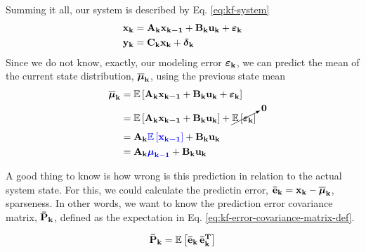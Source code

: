 \documentclass[12pt]{article}
\begin{document}
Summing it all, our system is described by Eq. \ref{eq:kf-system}
\begin{equation}
    \begin{aligned}
        \boldsymbol{\mathbf{x_k}} &= \boldsymbol{\mathbf{A_k}}\boldsymbol{\mathbf{x_{k-1}}} + \boldsymbol{\mathbf{B_k}}\boldsymbol{\mathbf{u_k}} + {\boldsymbol{\varepsilon}}_\mathbf{k}\\
        \boldsymbol{\mathbf{y_k}} &= \boldsymbol{\mathbf{C_k}}\boldsymbol{\mathbf{x_k}} + {\boldsymbol{\delta}}_\mathbf{k}
    \end{aligned}
    \label{eq:kf-system}
\end{equation}
Since we do not know, exactly, our modeling error ${\boldsymbol{\varepsilon}}_\mathbf{k}$, we can predict the mean of the current state distribution, ${\boldsymbol{\overline{\mu}}}_\mathbf{k}$, using the previous state mean
\begin{equation}
    \begin{aligned}
        {\boldsymbol{\overline{\mu}}}_\mathbf{k} &= \mathbb{E}\left[\boldsymbol{\mathbf{A_k}}\boldsymbol{\mathbf{x_{k-1}}} + \boldsymbol{\mathbf{B_k}}\boldsymbol{\mathbf{u_k}} + {\boldsymbol{\varepsilon}}_\mathbf{k}\right]\\
        & = \mathbb{E}\left[\boldsymbol{\mathbf{A_k}}\boldsymbol{\mathbf{x_{k-1}}} + \boldsymbol{\mathbf{B_k}}\boldsymbol{\mathbf{u_k}}\right] + \cancelto{\boldsymbol{\mathbf{0}}}{\mathbb{E}\left[{\boldsymbol{\varepsilon}}_\mathbf{k}\right]}\\
        &= \boldsymbol{\mathbf{A_k}}\color{blue}\mathbb{E}\left[\boldsymbol{\mathbf{x_{k-1}}}\right]\color{black} + \boldsymbol{\mathbf{B_k}}\boldsymbol{\mathbf{u_k}}\\
        &= \boldsymbol{\mathbf{A_k}}\color{blue}{\boldsymbol{\mu}}_\mathbf{k-1}\color{black} + \boldsymbol{\mathbf{B_k}}\boldsymbol{\mathbf{u_k}}
    \end{aligned}
    \label{eq:kf-prdiction}
\end{equation}

A good thing to know is how wrong is this prediction in relation to the actual system state. For this, we could calculate the predictin error, $\boldsymbol{\mathbf{\bar{e}_k}} = \boldsymbol{\mathbf{x_k}} - {\boldsymbol{\overline{\mu}}}_\mathbf{k}$, sparseness. In other words, we want to know the prediction error covariance matrix, $\boldsymbol{\mathbf{\bar{P}_k}}$, defined as the expectation in Eq. \ref{eq:kf-error-covariance-matrix-def}.

\begin{equation}
    \boldsymbol{\mathbf{\bar{P}_k}} = \mathbb{E}\left[\boldsymbol{\mathbf{\bar{e}_k}} \, \boldsymbol{\mathbf{\bar{e}_k^T}}\right]
    \label{eq:kf-error-covariance-matrix-def}
\end{equation}
\end{document}
